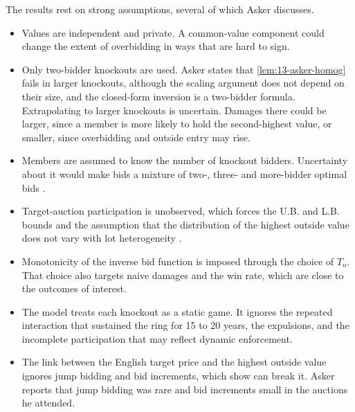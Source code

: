 The results rest on strong assumptions, several of which Asker discusses.
\begin{itemize}
\item Values are independent and private. A common-value component could change the extent of overbidding in ways
that are hard to sign.
\item Only two-bidder knockouts are used. Asker states that \cref{lem:13-asker-homog} fails in larger knockouts,
although the scaling argument does not depend on their size, and the closed-form inversion is a two-bidder formula.
Extrapolating to larger knockouts is uncertain. Damages there could be larger, since a member is more likely
to hold the second-highest value, or smaller, since overbidding and outside entry may rise.
\item Members are assumed to know the number of knockout bidders. Uncertainty about it would make bids a mixture of
two-, three- and more-bidder optimal bids \citep[footnote 52]{Asker2010}.
\item Target-auction participation is unobserved, which forces the U.B. and L.B. bounds and the assumption that the
distribution of the highest outside value does not vary with lot heterogeneity \citep[footnote 41]{Asker2010}.
\item Monotonicity of the inverse bid function is imposed through the choice of $T_n$. That choice also targets
naive damages and the win rate, which are close to the outcomes of interest.
\item The model treats each knockout as a static game. It ignores the repeated interaction that sustained the ring
for 15 to 20 years, the expulsions, and the incomplete participation that may reflect dynamic enforcement.
\item The link between the English target price and the highest outside value ignores jump bidding and bid
increments, which \citet{HaileTamer2003} show can break it. Asker reports that jump bidding was rare and bid
increments small in the auctions he attended.
\end{itemize}

